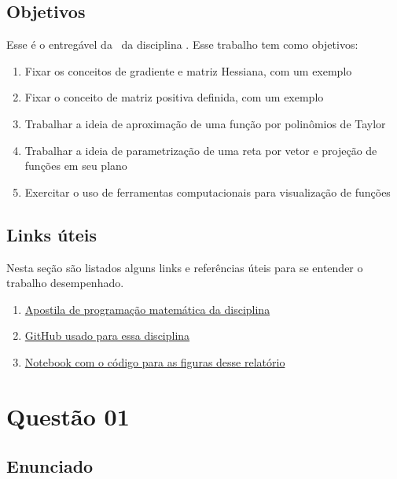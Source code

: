 \documentclass[10pt, a4paper]{article}
\begin{document}
\subsection{Objetivos}

Esse é o entregável da \TITLE \ da disciplina \DISCIPLINE. Esse trabalho tem como objetivos:

\begin{enumerate}
  \item Fixar os conceitos de gradiente e matriz Hessiana, com um exemplo
  \item Fixar o conceito de matriz positiva definida, com um exemplo
  \item Trabalhar a ideia de aproximação de uma função por polinômios de Taylor
  \item Trabalhar a ideia de parametrização de uma reta por vetor e projeção de funções em seu plano
  \item Exercitar o uso de ferramentas computacionais para visualização de funções
\end{enumerate}

\subsection{Links úteis}\label{links}

Nesta seção são listados alguns links e referências úteis para se entender o trabalho desempenhado.

\begin{enumerate}
  \item \href{https://web.tecgraf.puc-rio.br/~ivan/MEC2403/ProgMatematica_VazPereiraMenezes-Ago2012.pdf}{Apostila de programação matemática da disciplina}
  \item \href{https://github.com/prj-phcp/MEC2403_Activities}{GitHub usado para essa disciplina}
  \item \href{https://github.com/prj-phcp/MEC2403_Activities/blob/master/Lista0/Lista0.ipynb}{Notebook com o código para as figuras desse relatório}
\end{enumerate}

\section{Questão 01}

\subsection{Enunciado}
\end{document}
